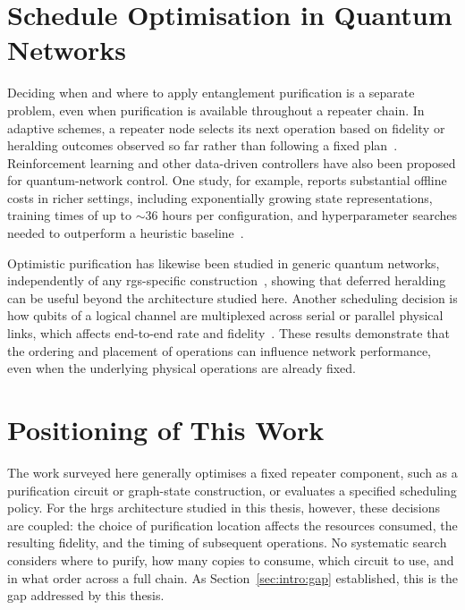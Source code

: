 \section{Schedule Optimisation in Quantum Networks}
\label{sec:rw:scheduling}

Deciding when and where to apply entanglement purification is a separate problem, even when purification is available throughout a repeater chain. In adaptive schemes, a repeater node selects its next operation based on fidelity or heralding outcomes observed so far rather than following a fixed plan~\cite{Munro2015Quantum}. Reinforcement learning and other data-driven controllers have also been proposed for quantum-network control. One study, for example, reports substantial offline costs in richer settings, including exponentially growing state representations, training times of up to $\sim 36$ hours per configuration, and hyperparameter searches needed to outperform a heuristic baseline~\cite{Yau2026Reinforcement}.

Optimistic purification has likewise been studied in generic quantum networks, independently of any \Gls{rgs}-specific construction~\cite{Mobayenjarihani2023Optimistic}, showing that deferred heralding can be useful beyond the architecture studied here. Another scheduling decision is how qubits of a logical channel are multiplexed across serial or parallel physical links, which affects end-to-end rate and fidelity~\cite{Meter2007Communication}. These results demonstrate that the ordering and placement of operations can influence network performance, even when the underlying physical operations are already fixed.

\section{Positioning of This Work}
\label{sec:rw:positioning}

The work surveyed here generally optimises a fixed repeater component, such as a purification circuit or graph-state construction, or evaluates a specified scheduling policy. For the \Gls{hrgs} architecture studied in this thesis, however, these decisions are coupled: the choice of purification location affects the resources consumed, the resulting fidelity, and the timing of subsequent operations. No systematic search considers where to purify, how many copies to consume, which circuit to use, and in what order across a full chain. As Section~\ref{sec:intro:gap} established, this is the gap addressed by this thesis.